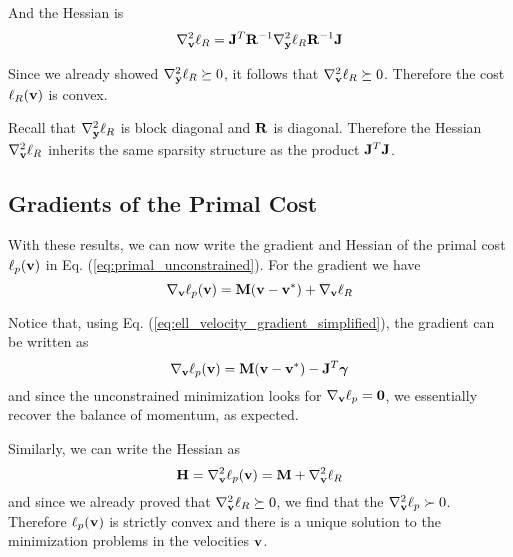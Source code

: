 And the Hessian is
\begin{equation}
	\nabla_\mf{v}^2\ell_R = \mf{J}^T\mf{R}^{-1}\nabla_\mf{y}^2\ell_R\mf{R}^{-1}\mf{J}
	\label{eq:ell_velocity_hessian}
\end{equation}

Since we already showed $\nabla_{\mathbf{y}}^2\ell_R\succeq 0$, it follows that
$\nabla_{\mathbf{v}}^2\ell_R\succeq 0$. Therefore the cost $\ell_R({\mathbf{v}})$ is convex.

Recall that $\nabla_{\mathbf{y}}^2\ell_R$ is block diagonal and ${\mathbf{R}}$ is diagonal.
Therefore the Hessian $\nabla_{\mathbf{v}}^2\ell_R$ inherits the same sparsity
structure as the product ${\mathbf{J}}^T{\mathbf{J}}$.

\subsection{Gradients of the Primal Cost}
With these results, we can now write the gradient and Hessian of the primal cost
$\ell_p({\mathbf{v}})$ in Eq. (\ref{eq:primal_unconstrained}). For the gradient we
have
\begin{equation}
	\nabla_{\mathbf{v}}\ell_p({\mathbf{v}}) = {\mathbf{M}}({\mathbf{v}}-{\mathbf{v}}^*) + \nabla_{\mathbf{v}}\ell_R
\end{equation}

Notice that, using Eq. (\ref{eq:ell_velocity_gradient_simplified}), the gradient
can be written as
\begin{equation}
	\nabla_{\mathbf{v}}\ell_p({\mathbf{v}}) = {\mathbf{M}}({\mathbf{v}}-{\mathbf{v}}^*) - {\mathbf{J}}^T{\bm\gamma}
\end{equation}
and since the unconstrained minimization looks for $\nabla_{\mathbf{v}}\ell_p={\mathbf{0}}$,
we essentially recover the balance of momentum, as expected.

Similarly, we can write the Hessian as
\begin{equation}
	{\mathbf{H}} = \nabla_{\mathbf{v}}^2\ell_p({\mathbf{v}}) = {\mathbf{M}} + \nabla_{\mathbf{v}}^2\ell_R
\end{equation}
and since we already proved that $\nabla_{\mathbf{v}}^2\ell_R\succeq 0$, we find that
the $\nabla_{\mathbf{v}}^2\ell_p\succ 0$. Therefore $\ell_p({\mathbf{v}})$ is strictly
convex and there is a unique solution to the minimization problems in the
velocities ${\mathbf{v}}$.
